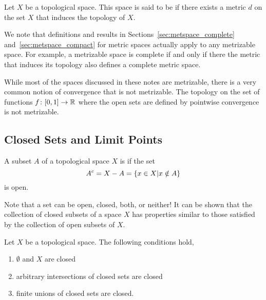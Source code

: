 \begin{definition}
Let $X$ be a topological space.
This space is said to be  if there exists a metric $d$ on the set $X$ that induces the topology of $X$.
\end{definition}

We note that definitions and results in Sections~\ref{sec:metspace_complete} and~\ref{sec:metspace_compact} for metric spaces actually apply to any metrizable space.
For example, a metrizable space is complete if and only if there the metric that induces its topology also defines a complete metric space.

\begin{example}
While most of the spaces discussed in these notes are metrizable, there is a very common notion of convergence that is not metrizable.
The topology on the set of functions $f \colon [0,1]\rightarrow \mathbb{R}$ where the open sets are defined by pointwise convergence is not metrizable.
\end{example}


\subsection{Closed Sets and Limit Points}

\begin{definition}
A subset $A$ of a topological space $X$ is  if the set
\begin{equation*}
{A}^{c} = X - A = \{ x \in X | x \notin A \}
\end{equation*}
is open.
\end{definition}

Note that a set can be open, closed, both, or neither!
It can be shown that the collection of closed subsets of a space $X$ has properties similar to those satisfied by the collection of open subsets of $X$.

\begin{fact}
Let $X$ be a topological space.
The following conditions hold,
\begin{enumerate}
\item $\emptyset$ and $X$ are closed
\item arbitrary intersections of closed sets are closed
\item finite unions of closed sets are closed.
\end{enumerate}
\end{fact}

